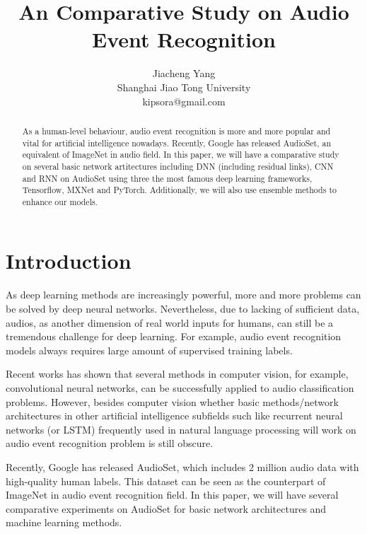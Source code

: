 \documentclass{article}
\title{An Comparative Study on Audio Event Recognition}
\author{
{\small Jiacheng Yang} \\
{\small Shanghai Jiao Tong University}\\
{\small \textsf{kipsora@gmail.com}}}
\date{}
\begin{document}
	\maketitle

	\begin{abstract}
		As a human-level behaviour, audio event recognition is more and more popular and vital for artificial intelligence nowadays. Recently, Google has released AudioSet\cite{45857}, an equivalent of ImageNet\cite{5206848} in audio field. In this paper, we will have a comparative study on several basic network artitectures including DNN (including residual links\cite{DBLP:journals/corr/HeZRS15}), CNN\cite{Krizhevsky:2012:ICD:2999134.2999257} and RNN\cite{DBLP:journals/corr/SakSB14,DBLP:journals/corr/ChungGCB14} on AudioSet using three the most famous deep learning frameworks, Tensorflow\cite{45381}, MXNet\cite{DBLP:journals/corr/ChenLLLWWXXZZ15} and PyTorch. Additionally, we will also use ensemble methods to enhance our models.
	\end{abstract}

	\section{Introduction}\label{sec:intro}
		As deep learning methods are increasingly powerful, more and more problems can be solved by deep neural networks. Nevertheless, due to lacking of sufficient data, audios, as another dimension of real world inputs for humans, can still be a tremendous challenge for deep learning. For example, audio event recognition models always requires large amount of supervised training labels. 

		Recent works has shown that several methods in computer vision, for example, convolutional neural networks, can be successfully applied to audio classification problems\cite{45611}. However, besides computer vision whether basic methods/network architectures in other artificial intelligence subfields such like recurrent neural networks (or LSTM) frequently used in natural language processing will work on audio event recognition problem is still obscure.

		Recently, Google has released AudioSet\cite{45857}, which includes 2 million audio data with high-quality human labels. This dataset can be seen as the counterpart of ImageNet in audio event recognition field. In this paper, we will have several comparative experiments on AudioSet for basic network architectures and machine learning methods.
\end{document}
